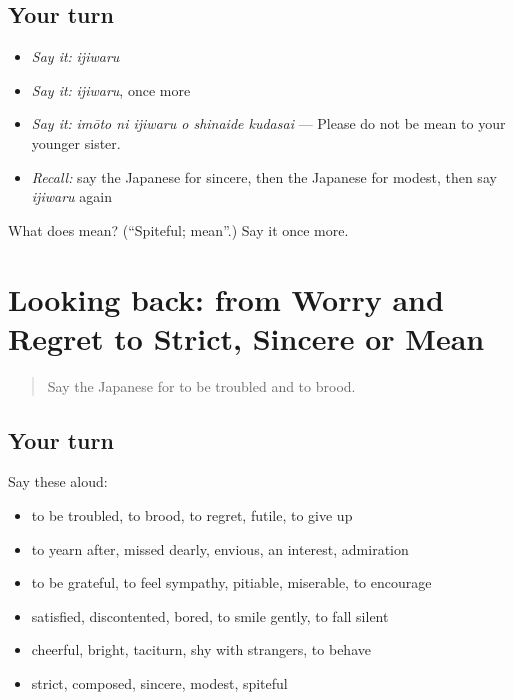 \subsection*{Your turn}
\begin{itemize}
\raggedright
  \item \emph{Say it:} \emph{ijiwaru}
  \item \emph{Say it:} \emph{ijiwaru}, once more
  \item \emph{Say it:} \emph{imōto ni ijiwaru o shinaide kudasai} — Please do not be mean to your younger sister.
  \item \emph{Recall:} say the Japanese for sincere, then the Japanese for modest, then say \emph{ijiwaru} again
\end{itemize}

\begin{tcolorbox}[breakable,colback=teal!4,colframe=teal!35!black,title={Before you move on}]
What does  mean? (\textquotedblleft{}Spiteful; mean\textquotedblright{}.) Say it once more.
\end{tcolorbox}
\section[(dialogue)]{Looking back: from Worry and Regret to Strict, Sincere or Mean}

\label{lesson:JA-R437-review-432-437}



\begin{quote}
Say the Japanese for to be troubled and to brood.
\end{quote}

\subsection*{Your turn}
Say these aloud:

\begin{itemize}
\raggedright
  \item to be troubled, to brood, to regret, futile, to give up
  \item to yearn after, missed dearly, envious, an interest, admiration
  \item to be grateful, to feel sympathy, pitiable, miserable, to encourage
  \item satisfied, discontented, bored, to smile gently, to fall silent
  \item cheerful, bright, taciturn, shy with strangers, to behave
  \item strict, composed, sincere, modest, spiteful
\end{itemize}

